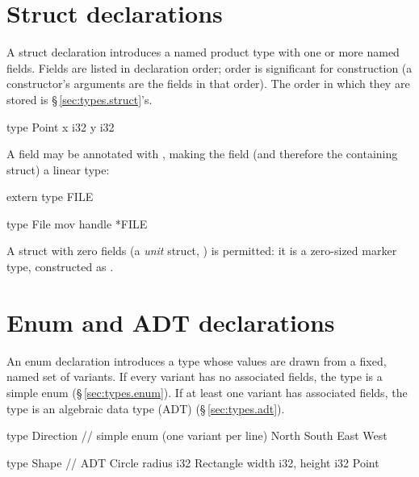 \section{Struct declarations}
\label{sec:decl.struct}

\pnum
A struct declaration introduces a named product type with one or more
named fields.  Fields are listed in declaration order; order is significant
for construction (a constructor's arguments are the fields in that order). The order in which
they are stored is \S\,\ref{sec:types.struct}'s.

\begin{laincode}
type Point {
    x i32
    y i32
}
\end{laincode}

\pnum
A field may be annotated with , making the field (and therefore
the containing struct) a linear type:

\begin{laincode}
extern type FILE

type File {
    mov handle *FILE
}
\end{laincode}

\begin{note}
  A struct with zero fields (a \textit{unit} struct, )
  is permitted: it is a zero-sized marker type, constructed as .
\end{note}

\section{Enum and ADT declarations}
\label{sec:decl.enum}

\pnum
An enum declaration introduces a type whose values are drawn from a fixed,
named set of variants.  If every variant has no associated fields, the type
is a simple enum (\S\,\ref{sec:types.enum}).  If at least one variant has
associated fields, the type is an algebraic data type (ADT)
(\S\,\ref{sec:types.adt}).

\begin{laincode}
type Direction {              // simple enum (one variant per line)
    North
    South
    East
    West
}

type Shape {                                  // ADT
    Circle     { radius i32 }
    Rectangle  { width i32, height i32 }
    Point
}
\end{laincode}

